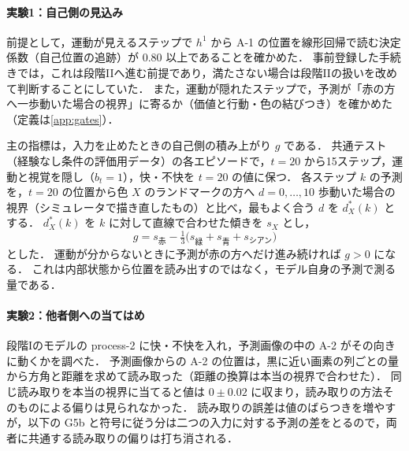 \begin{table}[p]
  \centering
  \footnotesize
  \caption{指標の定義と事前登録の区別}
  \label{tab:metrics}
  
\end{table}

\paragraph{実験1：自己側の見込み}
前提として，運動が見えるステップで $h^1$ から A-1 の位置を線形回帰で読む決定係数（自己位置の追跡）が 0.80 以上であることを確かめた．
事前登録した手続きでは，これは段階IIへ進む前提であり，満たさない場合は段階IIの扱いを改めて判断することにしていた．
また，運動が隠れたステップで，予測が「赤の方へ一歩動いた場合の視界」に寄るか（価値と行動・色の結びつき）を確かめた（定義は\ref{app:gates}）．

主の指標は，入力を止めたときの自己側の積み上がり $g$ である．
共通テスト（経験なし条件の評価用データ）の各エピソードで，$t=20$ から15ステップ，運動と視覚を隠し（$b_t=1$），快・不快を $t=20$ の値に保つ．
各ステップ $k$ の予測を，$t=20$ の位置から色 $X$ のランドマークの方へ $d=0,\dots,10$ 歩動いた場合の視界（シミュレータで描き直したもの）と比べ，最もよく合う $d$ を $d^{*}_{X}(k)$ とする．
$d^{*}_{X}(k)$ を $k$ に対して直線で合わせた傾きを $s_X$ とし，
\begin{equation}
  g = s_{\text{赤}} - \tfrac{1}{3}\bigl(s_{\text{緑}} + s_{\text{青}} + s_{\text{シアン}}\bigr)
\end{equation}
とした．
運動が分からないときに予測が赤の方へだけ進み続ければ $g>0$ になる．
これは内部状態から位置を読み出すのではなく，モデル自身の予測で測る量である．

\paragraph{実験2：他者側への当てはめ}
段階Iのモデルの process-2 に快・不快を入れ，予測画像の中の A-2 がその向きに動くかを調べた．
予測画像からの A-2 の位置は，黒に近い画素の列ごとの量から方角と距離を求めて読み取った（距離の換算は本当の視界で合わせた）．
同じ読み取りを本当の視界に当てると値は $0\pm0.02$ に収まり，読み取りの方法そのものによる偏りは見られなかった．
読み取りの誤差は値のばらつきを増やすが，以下の G5b と符号に従う分は二つの入力に対する予測の差をとるので，両者に共通する読み取りの偏りは打ち消される．

